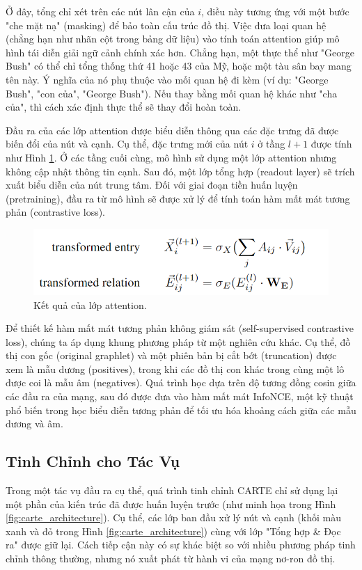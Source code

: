 \documentclass{article}
\begin{document}
Ở đây, tổng chỉ xét trên các nút lân cận của $i$, điều này tương ứng với một bước "che mặt nạ" (masking) để bảo toàn cấu trúc đồ thị. Việc đưa loại quan hệ (chẳng hạn như nhãn cột trong bảng dữ liệu) vào tính toán attention giúp mô hình tái diễn giải ngữ cảnh chính xác hơn. Chẳng hạn, một thực thể như "George Bush" có thể chỉ tổng thống thứ 41 hoặc 43 của Mỹ, hoặc một tàu sân bay mang tên này. Ý nghĩa của nó phụ thuộc vào mối quan hệ đi kèm (ví dụ: "George Bush", "con của", "George Bush"). Nếu thay bằng mối quan hệ khác như "cha của", thì cách xác định thực thể sẽ thay đổi hoàn toàn.

Đầu ra của các lớp attention được biểu diễn thông qua các đặc trưng đã được biến đổi của nút và cạnh. Cụ thể, đặc trưng mới của nút $i$ ở tầng $l+1$ được tính như Hình \ref{fig:attention_layers_output}. Ở các tầng cuối cùng, mô hình sử dụng một lớp attention nhưng không cập nhật thông tin cạnh. Sau đó, một lớp tổng hợp (readout layer) sẽ trích xuất biểu diễn của nút trung tâm. Đối với giai đoạn tiền huấn luyện (pretraining), đầu ra từ mô hình sẽ được xử lý để tính toán hàm mất mát tương phản (contrastive loss).

\begin{figure} 
    \centering
    \includegraphics[scale = 0.8]{attention_layers_output.png}
    \caption{Kết quả của lớp attention.}
    \label{fig:attention_layers_output}
\end{figure}

Để thiết kế hàm mất mát tương phản không giám sát (self-supervised contrastive loss), chúng ta áp dụng khung phương pháp từ một nghiên cứu khác. Cụ thể, đồ thị con gốc (original graphlet) và một phiên bản bị cắt bớt (truncation) được xem là mẫu dương (positives), trong khi các đồ thị con khác trong cùng một lô được coi là mẫu âm (negatives). Quá trình học dựa trên độ tương đồng cosin giữa các đầu ra của mạng, sau đó được đưa vào hàm mất mát InfoNCE, một kỹ thuật phổ biến trong học biểu diễn tương phản để tối ưu hóa khoảng cách giữa các mẫu dương và âm.



\subsection{Tinh Chỉnh cho Tác Vụ}
Trong một tác vụ đầu ra cụ thể, quá trình tinh chỉnh CARTE chỉ sử dụng lại một phần của kiến trúc đã được huấn luyện trước (như minh họa trong Hình \ref{fig:carte_architecture}). Cụ thể, các lớp ban đầu xử lý nút và cạnh (khối màu xanh và đỏ trong Hình \ref{fig:carte_architecture}) cùng với lớp "Tổng hợp \& Đọc ra" được giữ lại. Cách tiếp cận này có sự khác biệt so với nhiều phương pháp tinh chỉnh thông thường, nhưng nó xuất phát từ hành vi của mạng nơ-ron đồ thị.
\end{document}
